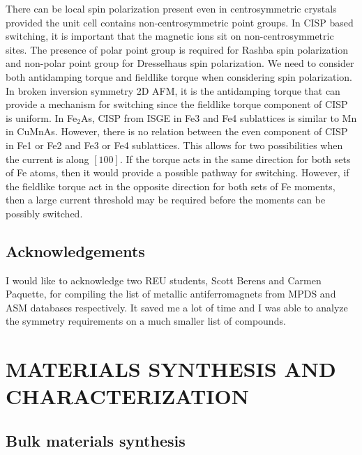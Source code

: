 \documentclass[letterpaper,10pt,doublespacing,edeposit]{uiucthesis2020}
\begin{document}
\begin{mainmatter}
There can be local spin polarization present even in centrosymmetric crystals provided the unit cell contains non-centrosymmetric point groups. In CISP based switching, it is important that the magnetic ions sit on non-centrosymmetric sites. The presence of polar point group is required for Rashba spin polarization and non-polar point group for Dresselhaus spin polarization. We need to consider both antidamping torque and fieldlike torque when considering spin polarization. In broken inversion symmetry 2D AFM, it is the antidamping torque that can provide a mechanism for switching since the fieldlike torque component of CISP is uniform. In Fe$_2$As, CISP from ISGE in Fe3 and Fe4 sublattices is similar to Mn in CuMnAs. However, there is no relation between the even component of CISP in Fe1 or Fe2 and Fe3 or Fe4 sublattices. This allows for two possibilities when the current is along $[100]$. If the torque acts in the same direction for both sets of Fe atoms, then it would provide a possible pathway for switching. However, if the fieldlike torque act in the opposite direction for both sets of Fe moments, then a large current threshold may be required before the moments can be possibly switched.

\section{Acknowledgements}


I would like to acknowledge two REU students, Scott Berens and Carmen Paquette, for compiling the list of metallic antiferromagnets from MPDS and ASM databases respectively. It saved me a lot of time and I was able to analyze the symmetry requirements on a much smaller list of compounds.





\chapter{MATERIALS SYNTHESIS AND CHARACTERIZATION}

\vspace{5mm}

\section{Bulk materials synthesis}



\end{mainmatter}
\end{document}
